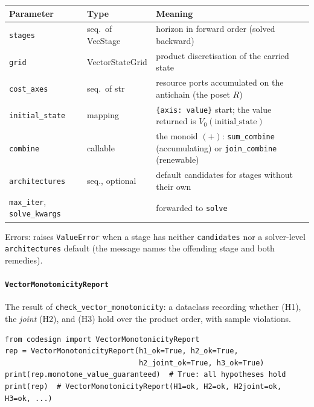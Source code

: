 \documentclass[11pt,a4paper]{article}
\begin{document}
\begin{center}
\begin{tabular}{@{}llp{}@{}}
\toprule
Parameter & Type & Meaning \\
\midrule
\texttt{stages} & seq.\ of VecStage & horizon in forward order (solved
  backward) \\
\texttt{grid} & VectorStateGrid & product discretisation of the carried
  state \\
\texttt{cost\_axes} & seq.\ of str & resource ports accumulated on the
  antichain (the poset \(R\)) \\
\texttt{initial\_state} & mapping & \texttt{\{axis: value\}} start; the
  value returned is \(V_0(\text{initial\_state})\) \\
\texttt{combine} & callable & the monoid \((+)\): \texttt{sum\_combine}
  (accumulating) or \texttt{join\_combine} (renewable) \\
\texttt{architectures} & seq., optional & default candidates for stages
  without their own \\
\texttt{max\_iter}, \texttt{solve\_kwargs} & & forwarded to
  \texttt{solve} \\
\bottomrule
\end{tabular}
\end{center}
Errors: raises \texttt{ValueError} when a stage has neither
\texttt{candidates} nor a solver-level \texttt{architectures} default (the
message names the offending stage and both remedies).

\paragraph{\texttt{VectorMonotonicityReport}}\label{ref:vector_dp:vectormonotonicityreport}
The result of \texttt{check\_vector\_monotonicity}: a dataclass recording
whether (H1), the \emph{joint} (H2), and (H3) hold over the product order,
with sample violations.

\begin{lstlisting}
from codesign import VectorMonotonicityReport
rep = VectorMonotonicityReport(h1_ok=True, h2_ok=True,
                               h2_joint_ok=True, h3_ok=True)
print(rep.monotone_value_guaranteed)  # True: all hypotheses hold
print(rep)  # VectorMonotonicityReport(H1=ok, H2=ok, H2joint=ok, H3=ok, ...)
\end{lstlisting}
\end{document}
